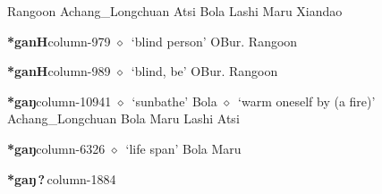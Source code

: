 \hspace{1ex}
         Rangoon 
\hspace{1ex}
         Achang\_Longchuan 
\hspace{1ex}
         Atsi 
\hspace{1ex}
         Bola 
\hspace{1ex}
         Lashi 
\hspace{1ex}
         Maru 
\hspace{1ex}
         Xiandao 
  \item {\footnotesize \textbf{*ganH}}{\tiny column-979}
         $\diamond$~`blind person'
         OBur. 
\hspace{1ex}
         Rangoon 
  \item {\footnotesize \textbf{*ganH}}{\tiny column-989}
         $\diamond$~`blind, be'
         OBur. 
\hspace{1ex}
         Rangoon 
  \item {\footnotesize \textbf{*gaŋ}}{\tiny column-10941}
         $\diamond$~`sunbathe'
         Bola 
\hspace{1ex}
         $\diamond$~`warm oneself by (a fire)'
         Achang\_Longchuan 
\hspace{1ex}
         Bola 
\hspace{1ex}
         Maru 
\hspace{1ex}
         Lashi 
\hspace{1ex}
         Atsi 
  \item {\footnotesize \textbf{*gaŋ}}{\tiny column-6326}
         $\diamond$~`life span'
         Bola 
\hspace{1ex}
         Maru 
  \item {\footnotesize \textbf{*gaŋ\,?\,}}{\tiny column-1884}
